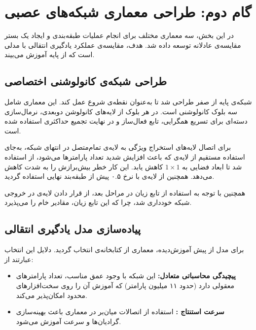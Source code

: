 \section{گام دوم: طراحی معماری شبکه‌های عصبی}

در این بخش، سه معماری مختلف برای انجام عملیات طبقه‌بندی و ایجاد یک بستر مقایسه‌ی عادلانه  توسعه داده شد. هدف، مقایسه‌ی عملکرد یادگیری انتقالی  با مدلی است که از پایه آموزش می‌بیند.

\subsection{طراحی شبکه‌ی کانولوشنی اختصاصی }
شبکه‌ی پایه از صفر  طراحی شد تا به‌عنوان نقطه‌ی شروع  عمل کند. این معماری شامل سه بلوک کانولوشنی است. در هر بلوک از لایه‌های کانولوشن دو‌بعدی، نرمال‌سازی دسته‌ای  برای تسریع همگرایی، تابع فعال‌ساز  و در نهایت تجمیع حداکثری  استفاده شده است.

\begin{tipbox}
برای اتصال لایه‌های استخراج ویژگی به لایه‌ی تمام‌متصل  در انتهای شبکه، به‌جای استفاده مستقیم از لایه‌ی  که باعث افزایش شدید تعداد پارامترها می‌شود، از  استفاده شد تا ابعاد فضایی به $1 \times 1$ کاهش یابد. این کار خطر بیش‌برازش  را به شدت کاهش می‌دهد. همچنین از لایه‌ی  با نرخ ۰.۵ پیش از طبقه‌بند نهایی استفاده گردید.
\end{tipbox}

همچنین با توجه به استفاده از تابع زیان  در مراحل بعد، از قرار دادن لایه‌ی  در خروجی شبکه خودداری شد، چرا که این تابع زیان، مقادیر خام  را می‌پذیرد.

\subsection{پیاده‌سازی مدل یادگیری انتقالی }
برای مدل از پیش آموزش‌دیده، معماری  از کتابخانه‌ی  انتخاب گردید. دلایل این انتخاب عبارتند از:
\begin{itemize}
    \item \textbf{پیچیدگی محاسباتی متعادل:} این شبکه با وجود عمق مناسب، تعداد پارامترهای معقولی دارد (حدود ۱۱ میلیون پارامتر) که آموزش آن را روی سخت‌افزارهای محدود امکان‌پذیر می‌کند.
    \item \textbf{سرعت استنتاج :} استفاده از اتصالات میان‌بر  در معماری  باعث بهینه‌سازی گرادیان‌ها و سرعت آموزش می‌شود.
\end{itemize}


